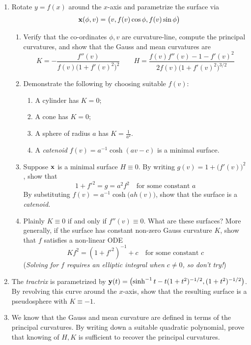 \begin{exercises}{}{}
\begin{enumerate}
		\goodbreak
	
	
		\item\label{exs:curvlinerotation} Rotate $y=f(x)$ around the $x$-axis and parametrize the surface via
		\[
			{\mathbf{x}}(\phi,v)=\bigl(v,f(v)\cos\phi,f(v)\sin\phi\bigr)
		\]
		\begin{enumerate}
		  \item Verify that the co-ordinates $\phi,v$ are curvature-line, compute the principal curvatures, and show that the Gauss and mean curvatures are
			\[
				K=-\frac{f''(v)}{f(v)\bigl(1+f'(v)^2\bigr)^2}\qquad H=\frac{f(v)f''(v)-1-f'(v)^2}{2f(v)\bigl(1+f'(v)^2\bigr)^{3/2}}
			\]
			\item Demonstrate the following by choosing suitable $f(v)$:
			\begin{enumerate}
			  \item A cylinder has $K=0$;
			  \item A cone has $K=0$;
			  \item A sphere of radius $a$ has $K=\frac 1{a^2}$.
			  \item A \emph{catenoid} $f(v)=a^{-1}\cosh(av-c)$ is a minimal surface.
			\end{enumerate}
	
		  \item Suppose ${\mathbf{x}}$ is a minimal surface $H\equiv 0$. By writing $g(v)=1+\bigl(f'(v)\bigr)^2$, show that
		  \[
		  	1+f'^2=g=a^2f^2 \quad\text{for some constant $a$}
		  \]
		  By substituting $f(v)=a^{-1}\cosh\bigl(ah(v)\bigr)$, show that the surface is a \emph{catenoid.}
		  
		  \item Plainly $K\equiv 0$ if and only if $f''(v)\equiv 0$. What are these surfaces? More generally, if the surface has constant non-zero Gauss curvature $K$, show that $f$ satisfies a non-linear ODE
		  \[
		  	Kf^2=(1+f'^2)^{-1}+c \quad\text{for some constant $c$}
		  \]
		  (\emph{Solving for $f$ requires an elliptic integral when $c\neq 0$, so don't try!})
		\end{enumerate}
		
		
		\item The \emph{tractrix} is parametrized by ${\mathbf{y}}(t)=\bigl(\sinh^{-1}t-t(1+t^2)^{-1/2}, (1+t^2)^{-1/2}\bigr)$. By revolving this curve around the $x$-axis, show that the resulting surface is a pseudosphere with $K\equiv -1$.
		
		
	  \item We know that the Gauss and mean curvature are defined in terms of the principal curvatures. By writing down a suitable quadratic polynomial, prove that knowing of $H,K$ is sufficient to recover the principal curvatures.
		

\end{enumerate}
\end{exercises}
